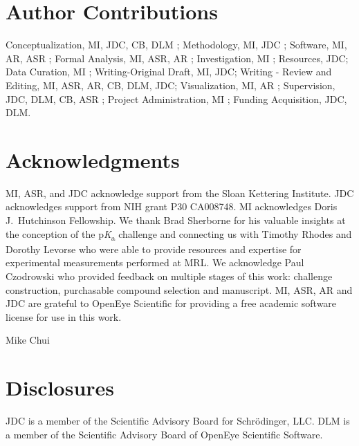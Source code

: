 \documentclass[9pt,lineno,final]{elife}
\newcommand{\pKa}{p\textit{K}\textsubscript{a}}
\begin{document}
\section{Author Contributions}

Conceptualization, MI, JDC, CB, DLM ; Methodology, MI, JDC ; Software, MI, AR, ASR ; Formal Analysis, MI, ASR, AR ; Investigation, MI ; Resources, JDC;  Data Curation, MI ; Writing-Original Draft, MI, JDC; Writing - Review and Editing, MI, ASR, AR, CB, DLM, JDC; Visualization, MI, AR ; Supervision, JDC, DLM, CB, ASR ; Project Administration, MI ; Funding Acquisition, JDC, DLM.


\section{Acknowledgments}

MI, ASR, and JDC acknowledge support from the Sloan Kettering Institute.
JDC acknowledges support from NIH grant P30 CA008748. 
MI acknowledges Doris J.\ Hutchinson Fellowship. 
We thank Brad Sherborne for his valuable insights at the conception of the \pKa{} challenge and connecting us with Timothy Rhodes and Dorothy Levorse who were able to provide resources and expertise for experimental measurements performed at MRL. 
We acknowledge Paul Czodrowski who provided feedback on multiple stages of this work: challenge construction, purchasable compound selection and manuscript. 
MI, ASR, AR and JDC are grateful to OpenEye Scientific for providing a free academic software license for use in this work.

Mike Chui

\section{Disclosures}

JDC is a member of the Scientific Advisory Board for Schr\"{o}dinger, LLC.
DLM is a member of the Scientific Advisory Board of OpenEye Scientific Software.
\end{document}
